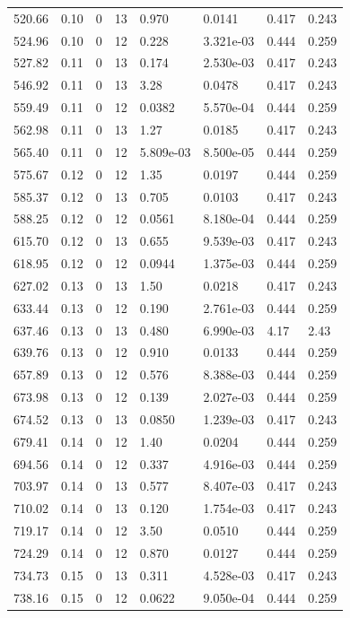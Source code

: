 \documentclass[preview]{standalone}
\begin{document}
{{{\begin{tabular}{L{1.2cm}C{1.2cm} C{0.3cm}C{0.5cm} C{1.4cm}C{1.4cm} C{1.4cm}C{1.4cm}}
  520.66  &  0.10  & 0     & 13 &  0.970  & 0.0141  & 0.417 &  0.243   \\ 
  524.96  &  0.10  & 0     & 12 &  0.228  & 3.321e-03  & 0.444 &  0.259   \\ 
  527.82  &  0.11  & 0     & 13 &  0.174  & 2.530e-03  & 0.417 &  0.243   \\ 
  546.92  &  0.11  & 0     & 13 &  3.28  & 0.0478  & 0.417 &  0.243   \\ 
  559.49  &  0.11  & 0     & 12 &  0.0382  & 5.570e-04  & 0.444 &  0.259   \\ 
  562.98  &  0.11  & 0     & 13 &  1.27  & 0.0185  & 0.417 &  0.243   \\ 
  565.40  &  0.11  & 0     & 12 &  5.809e-03  & 8.500e-05  & 0.444 &  0.259   \\ 
  575.67  &  0.12  & 0     & 12 &  1.35  & 0.0197  & 0.444 &  0.259   \\ 
  585.37  &  0.12  & 0     & 13 &  0.705  & 0.0103  & 0.417 &  0.243   \\ 
  588.25  &  0.12  & 0     & 12 &  0.0561  & 8.180e-04  & 0.444 &  0.259   \\ 
  615.70  &  0.12  & 0     & 13 &  0.655  & 9.539e-03  & 0.417 &  0.243   \\ 
  618.95  &  0.12  & 0     & 12 &  0.0944  & 1.375e-03  & 0.444 &  0.259   \\ 
  627.02  &  0.13  & 0     & 13 &  1.50  & 0.0218  & 0.417 &  0.243   \\ 
  633.44  &  0.13  & 0     & 12 &  0.190  & 2.761e-03  & 0.444 &  0.259   \\ 
  637.46  &  0.13  & 0     & 13 &  0.480  & 6.990e-03  & 4.17 &  2.43   \\ 
  639.76  &  0.13  & 0     & 12 &  0.910  & 0.0133  & 0.444 &  0.259   \\ 
  657.89  &  0.13  & 0     & 12 &  0.576  & 8.388e-03  & 0.444 &  0.259   \\ 
  673.98  &  0.13  & 0     & 12 &  0.139  & 2.027e-03  & 0.444 &  0.259   \\ 
  674.52  &  0.13  & 0     & 13 &  0.0850  & 1.239e-03  & 0.417 &  0.243   \\ 
  679.41  &  0.14  & 0     & 12 &  1.40  & 0.0204  & 0.444 &  0.259   \\ 
  694.56  &  0.14  & 0     & 12 &  0.337  & 4.916e-03  & 0.444 &  0.259   \\ 
  703.97  &  0.14  & 0     & 13 &  0.577  & 8.407e-03  & 0.417 &  0.243   \\ 
  710.02  &  0.14  & 0     & 13 &  0.120  & 1.754e-03  & 0.417 &  0.243   \\ 
  719.17  &  0.14  & 0     & 12 &  3.50  & 0.0510  & 0.444 &  0.259   \\ 
  724.29  &  0.14  & 0     & 12 &  0.870  & 0.0127  & 0.444 &  0.259   \\ 
  734.73  &  0.15  & 0     & 13 &  0.311  & 4.528e-03  & 0.417 &  0.243   \\ 
  738.16  &  0.15  & 0     & 12 &  0.0622  & 9.050e-04  & 0.444 &  0.259   \\ 
\hline 
\end{tabular} 

}}}
\end{document}
